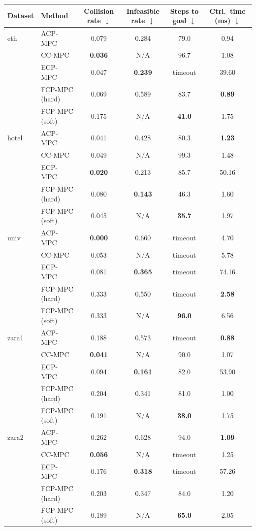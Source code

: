 \begin{tabular}{llcccc}
\hline
Dataset & Method & Collision rate $\downarrow$ & Infeasible rate $\downarrow$ & Steps to goal $\downarrow$ & Ctrl.\ time (ms) $\downarrow$ \\
\hline
eth & ACP-MPC~\cite{dixit2023adaptive} & 0.079 & 0.284 & 79.0 & 0.94 \\
 & CC-MPC~\cite{lekeufack2024decision} & \textbf{0.036} & N/A & 96.7 & 1.08 \\
 & ECP-MPC~\cite{shin2025egocentric} & 0.047 & \textbf{0.239} & timeout & 39.60 \\
 & FCP-MPC (hard) & 0.069 & 0.589 & 83.7 & \textbf{0.89} \\
 & FCP-MPC (soft) & 0.175 & N/A & \textbf{41.0} & 1.75 \\
\hline
hotel & ACP-MPC~\cite{dixit2023adaptive} & 0.041 & 0.428 & 80.3 & \textbf{1.23} \\
 & CC-MPC~\cite{lekeufack2024decision} & 0.049 & N/A & 99.3 & 1.48 \\
 & ECP-MPC~\cite{shin2025egocentric} & \textbf{0.020} & 0.213 & 85.7 & 50.16 \\
 & FCP-MPC (hard) & 0.080 & \textbf{0.143} & 46.3 & 1.60 \\
 & FCP-MPC (soft) & 0.045 & N/A & \textbf{35.7} & 1.97 \\
\hline
univ & ACP-MPC~\cite{dixit2023adaptive} & \textbf{0.000} & 0.660 & timeout & 4.70 \\
 & CC-MPC~\cite{lekeufack2024decision} & 0.053 & N/A & timeout & 5.78 \\
 & ECP-MPC~\cite{shin2025egocentric} & 0.081 & \textbf{0.365} & timeout & 74.16 \\
 & FCP-MPC (hard) & 0.333 & 0.550 & timeout & \textbf{2.58} \\
 & FCP-MPC (soft) & 0.333 & N/A & \textbf{96.0} & 6.56 \\
\hline
zara1 & ACP-MPC~\cite{dixit2023adaptive} & 0.188 & 0.573 & timeout & \textbf{0.88} \\
 & CC-MPC~\cite{lekeufack2024decision} & \textbf{0.041} & N/A & 90.0 & 1.07 \\
 & ECP-MPC~\cite{shin2025egocentric} & 0.094 & \textbf{0.161} & 82.0 & 53.90 \\
 & FCP-MPC (hard) & 0.204 & 0.341 & 81.0 & 1.00 \\
 & FCP-MPC (soft) & 0.191 & N/A & \textbf{38.0} & 1.75 \\
\hline
zara2 & ACP-MPC~\cite{dixit2023adaptive} & 0.262 & 0.628 & 94.0 & \textbf{1.09} \\
 & CC-MPC~\cite{lekeufack2024decision} & \textbf{0.056} & N/A & timeout & 1.25 \\
 & ECP-MPC~\cite{shin2025egocentric} & 0.176 & \textbf{0.318} & timeout & 57.26 \\
 & FCP-MPC (hard) & 0.203 & 0.347 & 84.0 & 1.20 \\
 & FCP-MPC (soft) & 0.189 & N/A & \textbf{65.0} & 2.05 \\
\hline
\end{tabular}